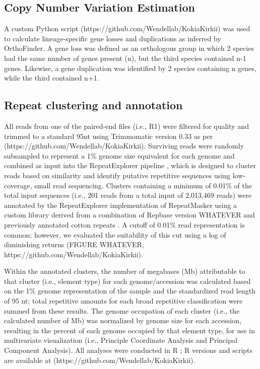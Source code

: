 \documentclass[10pt,letterpaper]{article}
\begin{document}
\subsection*{Copy Number Variation Estimation}
A custom Python script (https://github.com/Wendellab/KokiaKirkii) was used to
calculate lineage-specific gene losses and duplications as inferred by
OrthoFinder. A gene loss was defined as an orthologous group in which 2 species
had the same number of genes present (n), but the third species contained n-1
genes. Likewise, a gene duplication was identified by 2 species containing n
genes, while the third contained n+1.


\subsection*{Repeat clustering and annotation}
All reads from one of the paired-end files (i.e., R1) were filtered for quality
and trimmed to a standard 95nt using Trimmomatic version 0.33 \cite{Bolger2014}
as per (https://github.com/Wendellab/KokiaKirkii). Surviving reads were randomly
subsampled to represent a 1\% genome size equivalent for each genome
\cite{Hendrix2005} \cite{Wendel2002} and combined as input into the
RepeatExplorer pipeline \cite{Novak2013} \cite{Novak2010}, which is designed to
cluster reads based on similarity and identify putative repetitive sequences
using low-coverage, small read sequencing. Clusters containing a minimum of
0.01\% of the total input sequences (i.e., 201 reads from a total input of
2,013,469 reads) were annotated by the RepeatExplorer implementation of
RepeatMasker \cite{Smit2015} using a custom library derived from a combination
of Repbase version WHATEVER \cite{Bao2015} and previously annotated cotton
repeats \cite{Paterson2012} \cite{Grover2008} \cite{Grover2007}
\cite{Grover2004} \cite{Hawkins2006}. A cutoff of 0.01\% read representation is
common; however, we evaluated the suitability of this cut using a log of
diminishing returns (FIGURE WHATEVER; https://github.com/Wendellab/KokiaKirkii).

Within the annotated clusters, the number of megabases (Mb) attributable to that
cluster (i.e., element type) for each genome/accession was calculated based on
the 1\% genome representation of the sample and the standardized read length of
95 nt; total repetitive amounts for each broad repetitive classification were
summed from these results. The genome occupation of each cluster (i.e., the
calculated number of Mb) was normalized by genome size for each accession,
resulting in the percent of each genome occupied by that element type, for use
in multivariate visualization (i.e., Principle Coordinate Analysis and Principal
Component Analysis). All analyses were conducted in R \cite{R2017}; R versions
and scripts are available at (https://github.com/Wendellab/KokiaKirkii).
\end{document}
